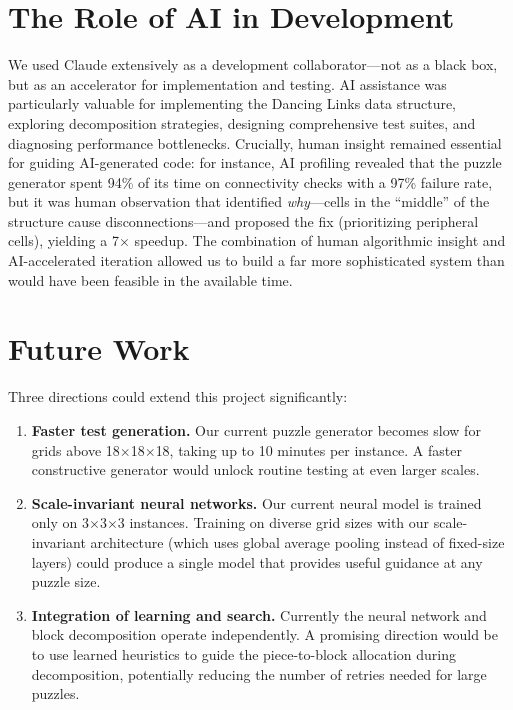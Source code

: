 \documentclass[11pt]{article}
\begin{document}
\section*{The Role of AI in Development}

We used Claude extensively as a development collaborator---not as a black box, but as an accelerator for implementation and testing. AI assistance was particularly valuable for implementing the Dancing Links data structure, exploring decomposition strategies, designing comprehensive test suites, and diagnosing performance bottlenecks. Crucially, human insight remained essential for guiding AI-generated code: for instance, AI profiling revealed that the puzzle generator spent 94\% of its time on connectivity checks with a 97\% failure rate, but it was human observation that identified \emph{why}---cells in the ``middle'' of the structure cause disconnections---and proposed the fix (prioritizing peripheral cells), yielding a 7$\times$ speedup. The combination of human algorithmic insight and AI-accelerated iteration allowed us to build a far more sophisticated system than would have been feasible in the available time.

\section*{Future Work}

Three directions could extend this project significantly:

\begin{enumerate}[nosep]
  \item \textbf{Faster test generation.} Our current puzzle generator becomes slow for grids above 18$\times$18$\times$18, taking up to 10 minutes per instance. A faster constructive generator would unlock routine testing at even larger scales.

  \item \textbf{Scale-invariant neural networks.} Our current neural model is trained only on 3$\times$3$\times$3 instances. Training on diverse grid sizes with our scale-invariant architecture (which uses global average pooling instead of fixed-size layers) could produce a single model that provides useful guidance at any puzzle size.

  \item \textbf{Integration of learning and search.} Currently the neural network and block decomposition operate independently. A promising direction would be to use learned heuristics to guide the piece-to-block allocation during decomposition, potentially reducing the number of retries needed for large puzzles.
\end{enumerate}
\end{document}
